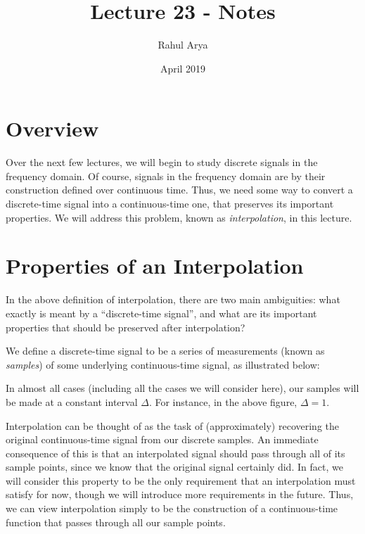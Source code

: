 \documentclass[letterpaper]{article}
\title{Lecture 23 - Notes}
\author{Rahul Arya}
\date{April 2019}
\theoremstyle{remark}
\begin{document}
\maketitle

\section{Overview}
Over the next few lectures, we will begin to study discrete signals in the frequency domain. Of course, signals in the frequency domain are by their construction defined over continuous time. Thus, we need some way to convert a discrete-time signal into a continuous-time one, that preserves its important properties. We will address this problem, known as \emph{interpolation}, in this lecture.

\section{Properties of an Interpolation}
In the above definition of interpolation, there are two main ambiguities: what exactly is meant by a ``discrete-time signal'', and what are its important properties that should be preserved after interpolation? 

We define a discrete-time signal to be a series of measurements (known as \emph{samples}) of some underlying continuous-time signal, as illustrated below:
\begin{center}
\end{center}
In almost all cases (including all the cases we will consider here), our samples will be made at a constant interval $\Delta$. For instance, in the above figure, $\Delta = 1$. 

Interpolation can be thought of as the task of (approximately) recovering the original continuous-time signal from our discrete samples. An immediate consequence of this is that an interpolated signal should pass through all of its sample points, since we know that the original signal certainly did. In fact, we will consider this property to be the only requirement that an interpolation must satisfy for now, though we will introduce more requirements in the future. Thus, we can view interpolation simply to be the construction of a continuous-time function that passes through all our sample points.
\end{document}
